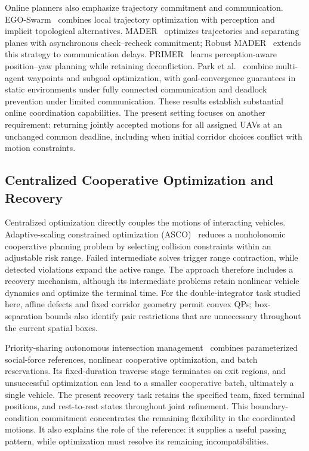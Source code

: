 Online planners also emphasize trajectory commitment and communication. EGO-Swarm~\cite{zhou2021ego} combines local trajectory optimization with perception and implicit topological alternatives. MADER~\cite{tordesillas2022} optimizes trajectories and separating planes with asynchronous check--recheck commitment; Robust MADER~\cite{kondo2024} extends this strategy to communication delays. PRIMER~\cite{kondo2025} learns perception-aware position--yaw planning while retaining deconfliction. Park et al.~\cite{park2025} combine multi-agent waypoints and subgoal optimization, with goal-convergence guarantees in static environments under fully connected communication and deadlock prevention under limited communication. These results establish substantial online coordination capabilities. The present setting focuses on another requirement: returning jointly accepted motions for all assigned UAVs at an unchanged common deadline, including when initial corridor choices conflict with motion constraints.

\subsection{Centralized Cooperative Optimization and Recovery}
Centralized optimization directly couples the motions of interacting vehicles. Adaptive-scaling constrained optimization (ASCO)~\cite{li2021asco} reduces a nonholonomic cooperative planning problem by selecting collision constraints within an adjustable risk range. Failed intermediate solves trigger range contraction, while detected violations expand the active range. The approach therefore includes a recovery mechanism, although its intermediate problems retain nonlinear vehicle dynamics and optimize the terminal time. For the double-integrator task studied here, affine defects and fixed corridor geometry permit convex QPs; box-separation bounds also identify pair restrictions that are unnecessary throughout the current spatial boxes.

Priority-sharing autonomous intersection management~\cite{li2023priority} combines parameterized social-force references, nonlinear cooperative optimization, and batch reservations. Its fixed-duration traverse stage terminates on exit regions, and unsuccessful optimization can lead to a smaller cooperative batch, ultimately a single vehicle. The present recovery task retains the specified team, fixed terminal positions, and rest-to-rest states throughout joint refinement. This boundary-condition commitment concentrates the remaining flexibility in the coordinated motions. It also explains the role of the reference: it supplies a useful passing pattern, while optimization must resolve its remaining incompatibilities.

